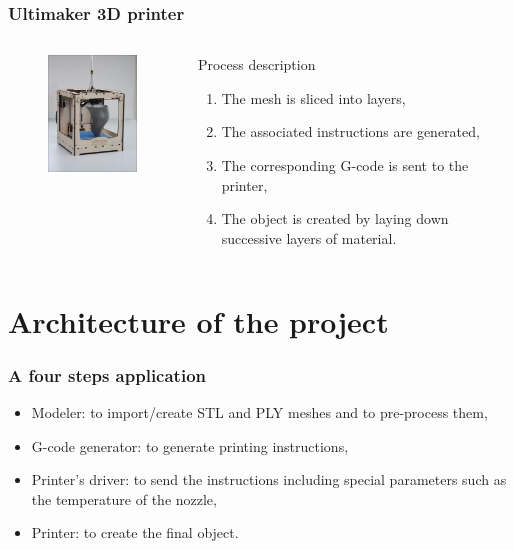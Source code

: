 \documentclass{beamer}
\begin{document}
\begin{frame}
	\frametitle{Ultimaker 3D printer}
	
	\begin{columns}[t]
  	\begin{column}{5cm}
  		\begin{figure}
		\includegraphics[width=4cm]{Ultimaker}	
		\end{figure}
  	\end{column}
  
  	\begin{column}{5cm}
  		\begin{block}{Process description}
  			\begin{enumerate}
  				\item The mesh is sliced into layers,
  				\item The associated instructions are generated,
  				\item The corresponding G-code is sent to the printer,
  				\item The object is created by laying down successive layers of material.
  			\end{enumerate}
 	 	\end{block}   
  	\end{column}
 	\end{columns}  
\end{frame}



\section{Architecture of the project}

\begin{frame}
	\frametitle{A four steps application}
	
	\begin{block}{}
		\begin{itemize}
			\item Modeler: to import/create STL and PLY meshes and to pre-process them,
			\item G-code generator: to generate printing instructions,
			\item Printer's driver: to send the instructions including special parameters such as the temperature of the nozzle,
			\item Printer: to create the final object.
		\end{itemize}
	\end{block}
	
\end{frame}
\end{document}
